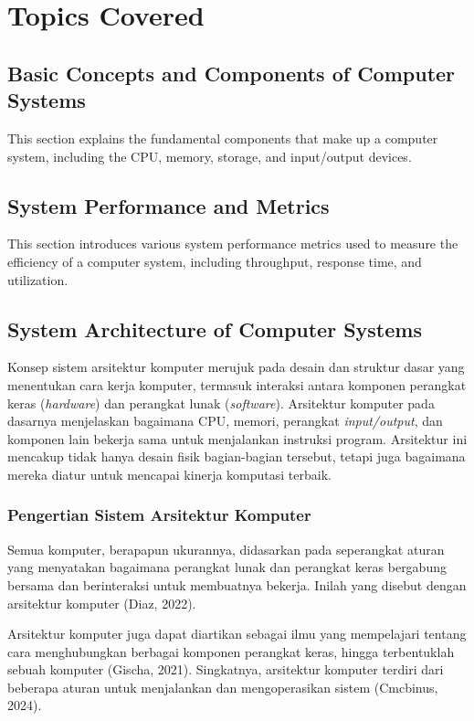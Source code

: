 \documentclass[12pt]{article}
\begin{document}
\section{Topics Covered}

\subsection{Basic Concepts and Components of Computer Systems}
This section explains the fundamental components that make up a computer system, including the CPU, memory, storage, and input/output devices.

\subsection{System Performance and Metrics}
This section introduces various system performance metrics used to measure the efficiency of a computer system, including throughput, response time, and utilization.


\subsection{System Architecture of Computer Systems}


Konsep sistem arsitektur komputer merujuk pada desain dan struktur dasar yang menentukan cara kerja komputer, termasuk interaksi antara komponen perangkat keras (\textit{hardware}) dan perangkat lunak (\textit{software}). Arsitektur komputer pada dasarnya menjelaskan bagaimana CPU, memori, perangkat \textit{input/output}, dan komponen lain bekerja sama untuk menjalankan instruksi program. Arsitektur ini mencakup tidak hanya desain fisik bagian-bagian tersebut, tetapi juga bagaimana mereka diatur untuk mencapai kinerja komputasi terbaik.

\subsubsection{Pengertian Sistem Arsitektur Komputer}


Semua komputer, berapapun ukurannya, didasarkan pada seperangkat aturan yang menyatakan bagaimana perangkat lunak dan perangkat keras bergabung bersama dan berinteraksi untuk membuatnya bekerja. Inilah yang disebut dengan arsitektur komputer (Diaz, 2022). 


Arsitektur komputer juga dapat diartikan sebagai ilmu yang mempelajari tentang cara menghubungkan berbagai komponen perangkat keras, hingga terbentuklah sebuah komputer (Gischa, 2021). Singkatnya, arsitektur komputer terdiri dari beberapa aturan untuk menjalankan dan mengoperasikan sistem (Cmcbinus, 2024).
\end{document}
